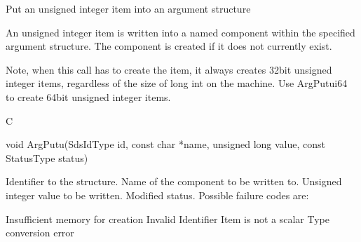 \begin{manroutinedescription}
      Put an unsigned integer item into an argument structure

      An unsigned integer item is written into a named component within the
      specified argument structure. The component is created if it
      does not currently exist.

      Note, when this call has to create the item, it always creates
      32bit unsigned integer {} items, regardless of the size of %
long int on
      the machine.  Use ArgPutui64 to create 64bit unsigned integer items.
 
      C

      void ArgPutu(SdsIdType id, const char *name, unsigned long value, const %
StatusType {\mantt{*}} status)
 
\begin{manparametertable}
 Identifier to the structure.
 Name of the component to be %
written to.
 Unsigned integer value %
to be written.
 Modified status. Possible %
failure codes are:
\end{manparametertable}
\begin{mantwocolumntable}
Insufficient memory for creation
Invalid Identifier
Item is not a scalar
Type conversion error
\end{mantwocolumntable}
\end{manroutinedescription}
